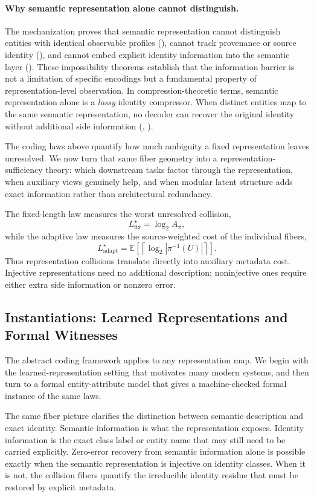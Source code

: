 \paragraph{Why semantic representation alone cannot distinguish.}
The mechanization proves that semantic representation cannot distinguish entities with identical observable profiles (), cannot track provenance or source identity (), and cannot embed explicit identity information into the semantic layer (). These impossibility theorems establish that the information barrier is not a limitation of specific encodings but a fundamental property of representation-level observation. In compression-theoretic terms, semantic representation alone is a \emph{lossy} identity compressor. When distinct entities map to the same semantic representation, no decoder can recover the original identity without additional side information (, ).

The coding laws above quantify how much ambiguity a fixed representation leaves unresolved. We now turn that same fiber geometry into a representation-sufficiency theory: which downstream tasks factor through the representation, when auxiliary views genuinely help, and when modular latent structure adds exact information rather than architectural redundancy.

The fixed-length law measures the worst unresolved collision,
\[
L^\star_{\mathrm{fix}} = \log_2 A_\pi,
\]
while the adaptive law measures the source-weighted cost of the individual fibers,
\[
L^\star_{\mathrm{adapt}} = \mathbb E\!\left[\left\lceil \log_2 |\pi^{-1}(U)| \right\rceil\right].
\]
Thus representation collisions translate directly into auxiliary metadata cost. Injective representations need no additional description; noninjective ones require either extra side information or nonzero error.

\subsection{Instantiations: Learned Representations and Formal Witnesses}

The abstract coding framework applies to any representation map. We begin with the learned-representation setting that motivates many modern systems, and then turn to a formal entity-attribute model that gives a machine-checked formal instance of the same laws.

The same fiber picture clarifies the distinction between semantic description and exact identity. Semantic information is what the representation exposes. Identity information is the exact class label or entity name that may still need to be carried explicitly. Zero-error recovery from semantic information alone is possible exactly when the semantic representation is injective on identity classes. When it is not, the collision fibers quantify the irreducible identity residue that must be restored by explicit metadata.

